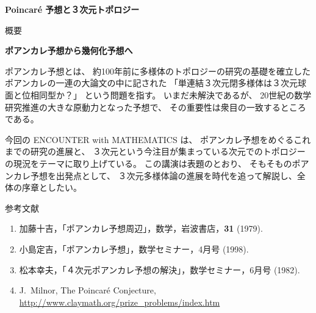\documentclass[uplatex,dvipdfmx]{jlreq}
\begin{document}
\begin{center}
  \vspace*{20pt}
  {\Huge\bfseries Poincaré 予想と３次元トポロジー}

  \vspace{1pc}
  {\Large 概要}
\end{center}

\vfill

\newpage

\begin{center}
  {\Large\bfseries ポアンカレ予想から幾何化予想へ}
\end{center}

\bigskip
\hspace*{\fill}{\large\bfseries 小島　定吉（東工大・情報理工）}

\bigskip

ポアンカレ予想とは、
約100年前に多様体のトポロジーの研究の基礎を確立した
ポアンカレの一連の大論文の中に記された
「単連結３次元閉多様体は３次元球面と位相同型か？」
という問題を指す。
いまだ未解決であるが、
20世紀の数学研究推進の大きな原動力となった予想で、
その重要性は衆目の一致するところである。

今回の ENCOUNTER with MATHEMATICS は、
ポアンカレ予想をめぐるこれまでの研究の進展と、
３次元という今注目が集まっている次元でのトポロジーの現況をテーマに取り上げている。
この講演は表題のとおり、
そもそものポアンカレ予想を出発点として、
３次元多様体論の進展を時代を追って解説し、全体の序章としたい。

\vspace{1pc}

\begin{center}
  \textsc{参考文献}
\end{center}
\begin{enumerate}
  \item[{[1]}] 加藤十吉，「ポアンカレ予想周辺」，数学，岩波書店，\textbf{31} (1979).
  \item[{[2]}] 小島定吉，「ポアンカレ予想」，数学セミナー，4月号 (1998).
  \item[{[3]}] 松本幸夫，「４次元ポアンカレ予想の解決」，数学セミナー，6月号 (1982).
  \item[{[4]}] J.~Milnor, The Poincaré Conjecture,\\
               \hspace*{\fill}\url{http://www.claymath.org/prize_problems/index.htm}
\end{enumerate}
\end{document}
